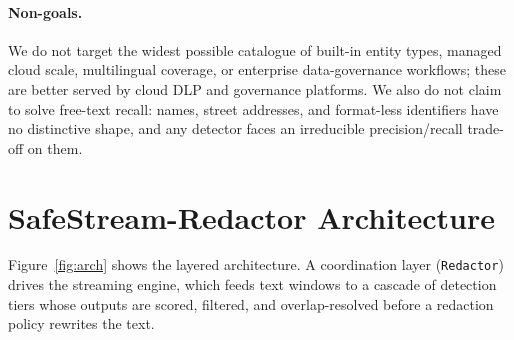 \documentclass[runningheads]{llncs}
\begin{document}
\paragraph{Non-goals.}
We do not target the widest possible catalogue of built-in entity types, managed
cloud scale, multilingual coverage, or enterprise data-governance workflows;
these are better served by cloud DLP and governance platforms. We also do not
claim to solve free-text recall: names, street addresses, and format-less
identifiers have no distinctive shape, and any detector faces an irreducible
precision/recall trade-off on them.

\section{SafeStream-Redactor Architecture}
\label{sec:arch}

Figure~\ref{fig:arch} shows the layered architecture. A coordination layer
(\texttt{Redactor}) drives the streaming engine, which feeds text windows to a
cascade of detection tiers whose outputs are scored, filtered, and
overlap-resolved before a redaction policy rewrites the text.
\end{document}
